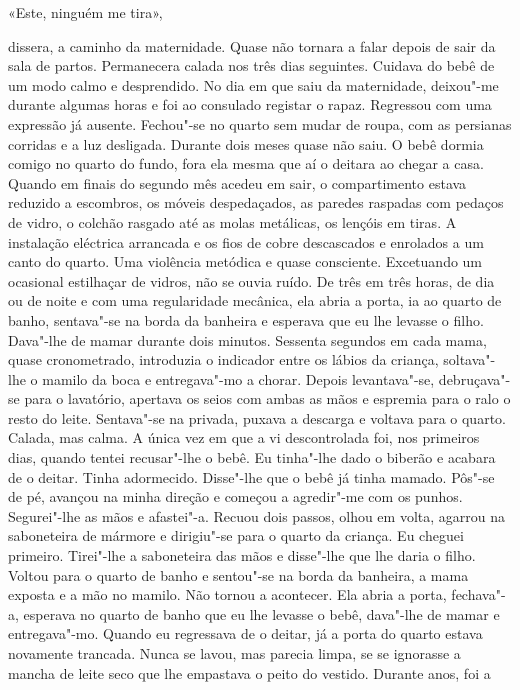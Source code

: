 «Este, ninguém me tira»,

dissera, a caminho da maternidade. Quase não tornara a falar depois de
sair da sala de partos. Permanecera calada nos três dias seguintes.
Cuidava do bebê de um modo calmo e desprendido. No dia em que saiu da
maternidade, deixou"-me durante algumas horas e foi ao consulado
registar o rapaz. Regressou com uma expressão já ausente. Fechou"-se no
quarto sem mudar de roupa, com as persianas corridas e a luz desligada.
Durante dois meses quase não saiu. O bebê dormia comigo no quarto do
fundo, fora ela mesma que aí o deitara ao chegar a casa. Quando em
finais do segundo mês acedeu em sair, o compartimento estava reduzido a
escombros, os móveis despedaçados, as paredes raspadas com pedaços de
vidro, o colchão rasgado até as molas metálicas, os lençóis em tiras. A
instalação eléctrica arrancada e os fios de cobre descascados e
enrolados a um canto do quarto. Uma violência metódica e quase
consciente. Excetuando um ocasional estilhaçar de vidros, não se ouvia
ruído. De três em três horas, de dia ou de noite e com uma regularidade
mecânica, ela abria a porta, ia ao quarto de banho, sentava"-se na borda
da banheira e esperava que eu lhe levasse o filho. Dava"-lhe de mamar
durante dois minutos. Sessenta segundos em cada mama, quase
cronometrado, introduzia o indicador entre os lábios da criança,
soltava"-lhe o mamilo da boca e entregava"-mo a chorar. Depois
levantava"-se, debruçava"-se para o lavatório, apertava os seios com
ambas as mãos e espremia para o ralo o resto do leite. Sentava"-se na
privada, puxava a descarga e voltava para o quarto. Calada, mas calma.
A única vez em que a vi descontrolada foi, nos primeiros dias, quando
tentei recusar"-lhe o bebê. Eu tinha"-lhe dado o biberão e acabara de o
deitar. Tinha adormecido. Disse"-lhe que o bebê já tinha mamado. Pôs"-se
de pé, avançou na minha direção e começou a agredir"-me com os punhos.
Segurei"-lhe as mãos e afastei"-a. Recuou dois passos, olhou em volta,
agarrou na saboneteira de mármore e dirigiu"-se para o quarto da
criança. Eu cheguei primeiro. Tirei"-lhe a saboneteira das mãos e
disse"-lhe que lhe daria o filho. Voltou para o quarto de banho e
sentou"-se na borda da banheira, a mama exposta e a mão no mamilo. Não
tornou a acontecer. Ela abria a porta, fechava"-a, esperava no quarto de
banho que eu lhe levasse o bebê, dava"-lhe de mamar e entregava"-mo.
Quando eu regressava de o deitar, já a porta do quarto estava novamente
trancada. Nunca se lavou, mas parecia limpa, se se ignorasse a mancha de
leite seco que lhe empastava o peito do vestido. Durante anos, foi a
